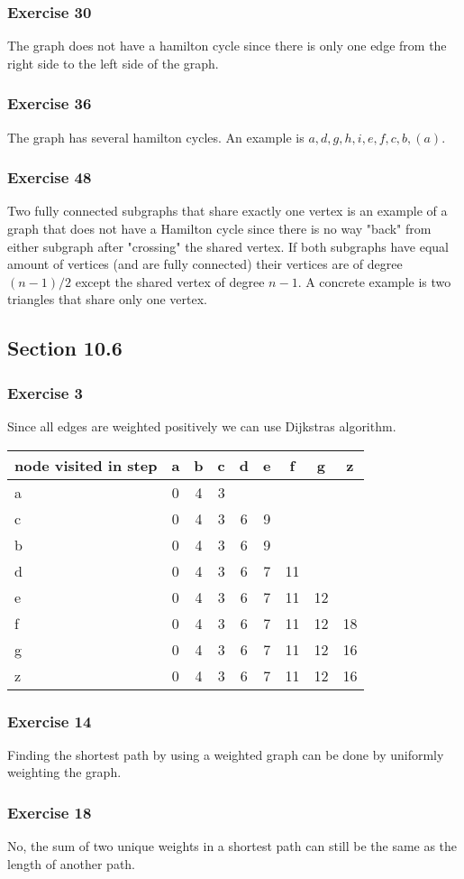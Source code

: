 \documentclass[a4paper]{article}
\newcommand{\ex}[1]{\subsubsection*{#1}}
\begin{document}
\ex{Exercise 30}

The graph does not have a hamilton cycle since there is only one edge from the
    right side to the left side of the graph.

\ex{Exercise 36}

The graph has several hamilton cycles. An example is \(a, d, g, h, i, e, f, c, b, (a)\).

\ex{Exercise 48}

Two fully connected subgraphs that share exactly one vertex is an example of a
    graph that does not have a Hamilton cycle since there is no way "back" from
    either subgraph after "crossing" the shared vertex. If both subgraphs have
    equal amount of vertices (and are fully connected) their vertices are of
    degree \((n-1)/2\) except the shared vertex of degree \(n-1\). A concrete
    example is two triangles that share only one vertex.

\subsection*{Section 10.6}

\ex{Exercise 3}

Since all edges are weighted positively we can use Dijkstras algorithm. 

\begin{tabular}{l | c c c c c c c c}
    node visited in step & a & b & c & d & e & f & g & z \\
    \hline 
    a & 0 & 4 & 3 \\
    c & 0 & 4 & 3 & 6 & 9 \\
    b & 0 & 4 & 3 & 6 & 9 \\
    d & 0 & 4 & 3 & 6 & 7 & 11 \\
    e & 0 & 4 & 3 & 6 & 7 & 11 & 12 \\
    f & 0 & 4 & 3 & 6 & 7 & 11 & 12 & 18 \\
    g & 0 & 4 & 3 & 6 & 7 & 11 & 12 & 16 \\
    z & 0 & 4 & 3 & 6 & 7 & 11 & 12 & 16 \\
\end{tabular}

\ex{Exercise 14}

Finding the shortest path by using a weighted graph can be done by uniformly
    weighting the graph.

\ex{Exercise 18}

No, the sum of two unique weights in a shortest path can still be the same as
    the length of another path.


%
\end{document}

